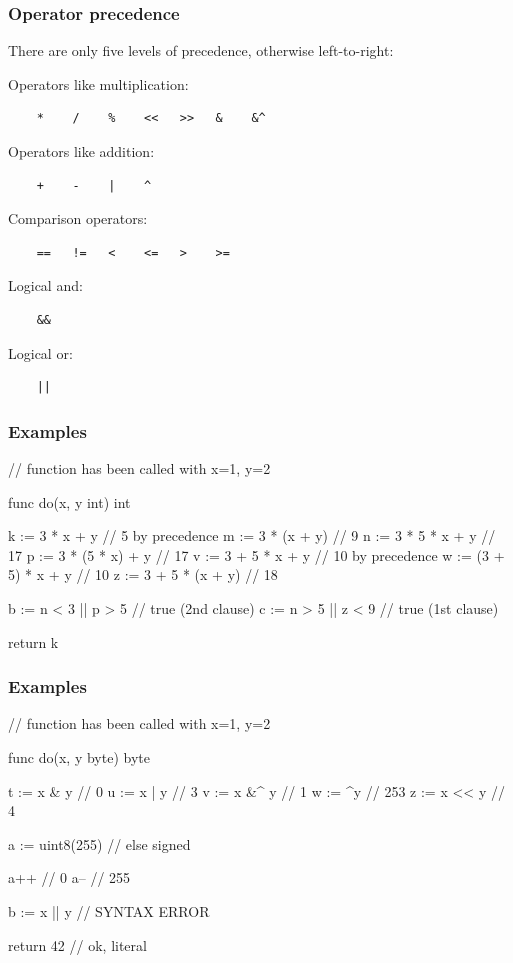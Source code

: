 \documentclass[handout,compress,t,11pt]{beamer}
\begin{document}
\begin{frame}[fragile]
    \frametitle{Operator precedence}
    There are only five levels of precedence, otherwise left-to-right: \par
    \vspace{0.5\baselineskip}
    Operators like multiplication: 
{\scriptsize\begin{verbatim}
    *    /    %    <<   >>   &    &^
\end{verbatim}}
    Operators like addition:
{\scriptsize\begin{verbatim}
    +    -    |    ^
\end{verbatim}}
    Comparison operators:
{\scriptsize\begin{verbatim}
    ==   !=   <    <=   >    >=
\end{verbatim}}
    Logical and:
{\scriptsize\begin{verbatim}
    &&
\end{verbatim}}
    Logical or:
{\scriptsize\begin{verbatim}
    ||
\end{verbatim}}
\end{frame}

\begin{frame}[fragile]
    \frametitle{Examples}
\begin{golang}
// function has been called with x=1, y=2

func do(x, y int) int {
    k := 3 * x + y          // 5  by precedence
    m := 3 * (x + y)        // 9
    n := 3 * 5 * x + y      // 17
    p := 3 * (5 * x) + y    // 17
    v := 3 + 5 * x + y      // 10 by precedence
    w := (3 + 5) * x + y    // 10
    z := 3 + 5 * (x + y)    // 18

    b := n < 3 || p > 5     // true (2nd clause)
    c := n > 5 || z < 9     // true (1st clause)

    return k
}
\end{golang}
\end{frame}

\begin{frame}[fragile]
    \frametitle{Examples}
\begin{golang}
// function has been called with x=1, y=2

func do(x, y byte) byte {
	t := x & y              // 0
	u := x | y              // 3
	v := x &^ y             // 1
	w := ^y                 // 253
	z := x << y             // 4

    a := uint8(255)         // else signed

    a++                     // 0
    a--                     // 255

    b := x || y             // SYNTAX ERROR

    return 42               // ok, literal
}
\end{golang}
\end{frame}
\end{document}
